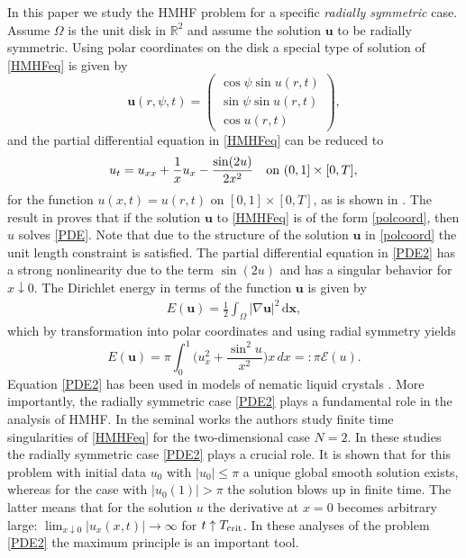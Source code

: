 \documentclass{siamltex}
\newcommand{\R}{\mathbb{R}}
\newcommand{\bu}{\mathbf u}
\newcommand{\cE}{\mathcal E}
\begin{document}
 In this paper we study the HMHF problem for a specific \emph{radially symmetric} case. Assume $\Omega$ is the unit disk in $\R^2$ and assume the solution $\bu$  to be radially symmetric. Using polar coordinates on the disk a special type of solution  of \eqref{HMHFeq} is given by
 \begin{equation} \label{polcoord} \mathbf{u}(r,\psi,t) =
   \begin{pmatrix}  \cos{\psi} \sin{ u(r,t) } \\  \sin{\psi} \sin{ u(r,t) } \\ \cos{ u(r,t)}\end{pmatrix}, 
\end{equation}
and the partial differential equation in \eqref{HMHFeq} can be reduced to 
 \begin{equation} \label{PDE2}
  u_t  = u_{xx} + \frac{1}{x}u_x - \frac{\sin(2u)}{2 x^2} \quad \text{on}~ (0,1] \times [0,T],  \\
\end{equation}
  for the function $u(x,t)=u(r,t)$ on $[0,1] \times [0,T]$, as is shown in \cite[Section 2.1]{RoxanasPhD2017}. The result in \cite[Lemma 2.2]{Chang1991} proves that if the solution $\mathbf{u}$ to \eqref{HMHFeq} is of the form \eqref{polcoord}, then $u$ solves \eqref{PDE}.   
Note that due to the structure  of the solution $\bu$ in \eqref{polcoord} the unit length constraint is satisfied. The
partial differential equation in \eqref{PDE2} has a strong nonlinearity due to the term  $\sin(2u)$ and has a singular behavior for $x \downarrow 0$. 
  The Dirichlet energy in terms of the  function $\mathbf{u}$ is given by 
  \begin{align*}
  	E(\mathbf{u}) = \frac{1}{2} \int_\Omega | \nabla \mathbf{u} |^2 \,\mathrm{d} \mathbf{x},
  \end{align*}
 which by transformation into polar coordinates and using radial symmetry yields
 \begin{equation}
 	E(\mathbf{u}) =  \pi \int_0^1 \big( u_x^2 + \frac{\sin^2 u}{x^2})x \, dx =: \pi \cE(u). \label{energy}
 \end{equation} 
Equation \eqref{PDE2} has been used in models of nematic liquid crystals \cite{vandHout2001}. More importantly, 
 the radially symmetric case \eqref{PDE2} plays a fundamental role in the analysis of HMHF.  
 In the seminal works \cite{ChangDingYe1992,Chang1991} the authors study  finite time singularities of \eqref{HMHFeq}
 for the two-dimensional case $N=2$. In these studies the radially symmetric case  \eqref{PDE2} 
 plays a crucial role. It is shown that for this problem with initial data $u_0$ with $|u_0| \leq \pi$ a unique global smooth solution exists, whereas for the case with  $|u_0(1)|> \pi$ the solution blows up in finite time. The latter means that for the solution $u$ the derivative at $x=0$ becomes arbitrary large: $\lim_{ x\downarrow 0} |u_x(x,t)| \to \infty$ for $t \uparrow T_{\rm crit}$. In these analyses of the problem \eqref{PDE2} the maximum principle is an important tool.
\end{document}
